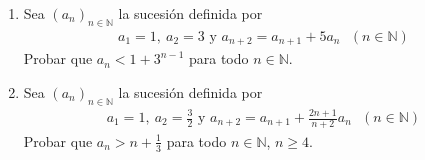 \begin{enunciado}{\ejercicio}
    \begin{enumerate}[label=\roman*)]
        \item Sea $(a_n)_{n \in \mathbb{N}}$ la sucesión definida por
        \begin{align*}
            a_1 = 1,\ a_2 = 3 \text{ y } a_{n+2} = a_{n+1} + 5a_n \ \ \ (n \in \mathbb{N})
        \end{align*}
        Probar que $a_n < 1 + 3^{n-1}$ para todo $n \in \mathbb{N}$.

        \item Sea $(a_n)_{n \in \mathbb{N}}$ la sucesión definida por
        \begin{align*}
            a_1 = 1,\ a_2 = \frac{3}{2} \text{ y } a_{n+2} = a_{n+1} + \frac{2n+1}{n+2}a_n \ \ \ (n \in \mathbb{N})
        \end{align*}
        Probar que $a_n > n + \displaystyle \frac{1}{3}$ para todo $n \in \mathbb{N}$, $n \geq 4$.
    \end{enumerate}
\end{enunciado}

